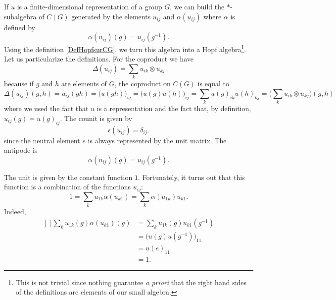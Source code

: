 If $u$ is a finite-dimensional representation of a group $G$, we can build the $*$-subalgebra of $C(G)$ generated by the elements $u_{ij}$ and $\alpha(u_{ij})$ where $\alpha$ is defined by
\begin{equation}
    \alpha(u_{ij})(g)=u_{ij}(g^{-1}).
\end{equation}
Using the definition \ref{DefHopfsurCG}, we turn this algebra into a Hopf algebra\footnote{This is not trivial since nothing guarantee \emph{a priori} that the right hand sides of the definitions are elements of our small algebra.}. Let us particularize the definitions. For the coproduct we have
\begin{equation}
    \Delta(u_{ij})=\sum_k u_{ik}\otimes u_{kj}
\end{equation}
because if $g$ and $h$ are elements of $G$, the coproduct on $C(G)$ is equal to
\begin{equation}
    \Delta(u_{ij})(g,h)=u_{ij}(gh)=\big( u(gh) \big)_{ij}=\big( u(g)u(h) \big)_{ij}=\sum_k u(g)_{ik}u(h)_{kj}=\Big( \sum_k u_{ik}\otimes u_{kj}\Big)(g,h)
\end{equation}
where we used the fact that $u$ is a representation and the fact that, by definition, $u_{ij}(g)=u(g)_{ij}$. The counit is given by
\begin{equation}
    \epsilon(u_{ij})=\delta_{ij}.
\end{equation}
since the neutral element $e$ is always represented by the unit matrix. The antipode is 
\begin{equation}
    \alpha(u_{ij})(g)=u_{ij}(g^{-1}).
\end{equation}

The unit is given by the constant function $1$. Fortunately, it turns out that this function is a combination of the functions $u_{ij}$:
\begin{equation}
    1=\sum_k u_{1k}\alpha(u_{k1})=\sum_k\alpha(u_{1k})u_{k1}.
\end{equation}
Indeed,
\begin{equation}
    \begin{aligned}[]
        \sum_ku_{1k}(g)\alpha(u_{k1})(g)&=\sum_ku_{1k}(g)u_{k1}(g^{-1})  \\
        &=\Big( u(g)u(g^{-1}) \Big)_{11}\\
        &=u(e)_{11}\\
        &=1.
    \end{aligned}
\end{equation}

